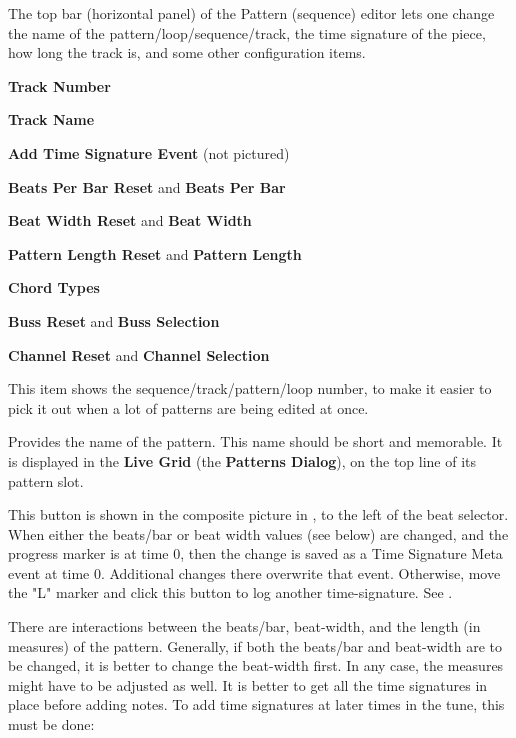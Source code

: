    The top bar (horizontal panel) of the Pattern (sequence) editor
   lets one change the name of
   the pattern/loop/sequence/track, the time signature of the piece, how long
   the track is, and some other configuration items.

   \begin{enumber}
      \item \textbf{Track Number}
      \item \textbf{Track Name}
      \item \textbf{Add Time Signature Event} (not pictured)
      \item \textbf{Beats Per Bar Reset} and \textbf{Beats Per Bar}
      \item \textbf{Beat Width Reset} and \textbf{Beat Width}
      \item \textbf{Pattern Length Reset} and \textbf{Pattern Length}
      \item \textbf{Chord Types}
      \item \textbf{Buss Reset} and \textbf{Buss Selection}
      \item \textbf{Channel Reset} and \textbf{Channel Selection}
   \end{enumber}

   \setcounter{ItemCounter}{0}      %

   This item shows the sequence/track/pattern/loop
   number, to make it easier to pick it out when a lot of patterns are being
   edited at once.

   Provides the name of the pattern.
   This name should be short and memorable.
   It is displayed in the \textbf{Live Grid} (the \textbf{Patterns Dialog}),
   on the top line of its pattern slot.

   This button is shown in the composite picture in
   ,
   to the left of the beat selector.
   When either the beats/bar or beat width values (see below) are changed,
   and the progress marker is at time 0, then the change is
   saved as a Time Signature Meta event at time 0. Additional changes there
   overwrite that event.
   Otherwise, move the "L" marker and click this button to log another
   time-signature.
   See .

   There are interactions between the beats/bar, beat-width, and the length (in
   measures) of the pattern.
   Generally, if both the beats/bar and beat-width are to be changed,
   it is better to change the beat-width first.
   In any case, the measures might have to be adjusted as well.
   It is better to get all the time signatures in place before adding notes.
   To add time signatures at later times in the tune, this must be done:

